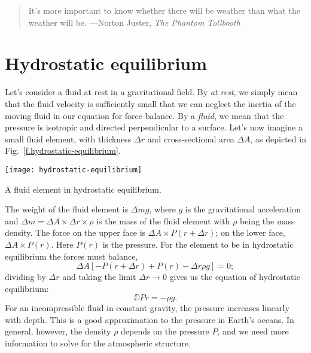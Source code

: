 
\begin{quote} It's more important to know whether there will be weather than what the weather will be. ---Norton Juster, \emph{The Phantom Tollbooth}\end{quote}

\section{Hydrostatic equilibrium}

Let's consider a fluid at rest in a gravitational field. By \emph{at rest}, we simply mean that the fluid velocity is sufficiently small that we can neglect the inertia of the moving fluid in our equation for force balance.  By a \emph{fluid}, we mean that the pressure is isotropic and directed perpendicular to a surface.  Let's now imagine a small fluid element, with thickness $\Delta r$ and cross-sectional area $\Delta A$, as depicted in Fig.~\ref{f.hydrostatic-equilibrium}.
\begin{marginfigure}
\texttt{[image: hydrostatic-equilibrium]}
\caption[A fluid element in hydrostatic equilibrium]{A fluid element in hydrostatic equilibrium.
\label{f.hydrostatic-equilibrium}}
\end{marginfigure}

The weight of the fluid element is $\Delta m g$, where $g$ is the gravitational acceleration and $\Delta m =  \Delta A\times\Delta r\times \rho$ is the mass of the fluid element with $\rho$ being the mass density.
The force on the upper face is $\Delta A\times P(r+\Delta r)$; on the lower face, $\Delta A\times P(r)$.  Here $P(r)$ is the pressure.  For the element to be in hydrostatic equilibrium the forces must balance,
\[
	\Delta A \left[ -P(r+\Delta r) + P(r) - \Delta r \rho g  \right] = 0;
\]
dividing by $\Delta r$ and taking the limit $\Delta r \to 0$ gives us the equation of hydrostatic equilibrium:
\begin{equation}\label{e.hydrostatic-equilibrium}
	\DD{P}{r} = -\rho g.
\end{equation}
For an incompressible fluid in constant gravity, the pressure increases linearly with depth. This is a good approximation to the pressure in Earth's oceans.  In general, however, the density $\rho$ depends on the pressure $P$, and we need more information to solve for the atmospheric structure.

